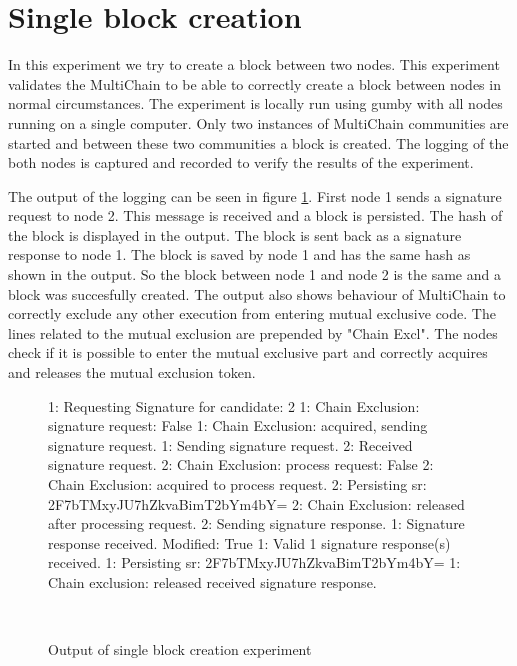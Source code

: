 \section{Single block creation}
In this experiment we try to create a block between two nodes.
This experiment validates the MultiChain to be able to correctly create a block between nodes in normal circumstances.
The experiment is locally run using gumby with all nodes running on a single computer.
Only two instances of MultiChain communities are started and between these two communities a block is created.
The logging of the both nodes is captured and recorded to verify the results of the experiment.

The output of the logging can be seen in figure \ref{fig:singleblockexperiment}.
First node 1 sends a signature request to node 2.
This message is received and a block is persisted.
The hash of the block is displayed in the output.
The block is sent back as a signature response to node 1.
The block is saved by node 1 and has the same hash as shown in the output.
So the block between node 1 and node 2 is the same and a block was succesfully created.
The output also shows behaviour of MultiChain
to correctly exclude any other execution from entering mutual exclusive code.
The lines related to the mutual exclusion are prepended by "Chain Excl".
The nodes check if it is possible to enter the mutual exclusive part and correctly acquires
and releases the mutual exclusion token.

\begin{figure}
\begin{FVerbatim}[fontsize=\small]
1: Requesting Signature for candidate: 2
1: Chain Exclusion: signature request: False
1: Chain Exclusion: acquired, sending signature request.
1: Sending signature request.
2: Received signature request.
2: Chain Exclusion: process request: False
2: Chain Exclusion: acquired to process request.
2: Persisting sr: 2F7bTMxyJU7hZkvaBimT2bYm4bY=
2: Chain Exclusion: released after processing request.
2: Sending signature response.
1: Signature response received. Modified: True
1: Valid 1 signature response(s) received.
1: Persisting sr: 2F7bTMxyJU7hZkvaBimT2bYm4bY=
1: Chain exclusion: released received signature response.
\end{FVerbatim}
    \caption{Output of single block creation experiment}~\label{fig:singleblockexperiment}
\end{figure}
